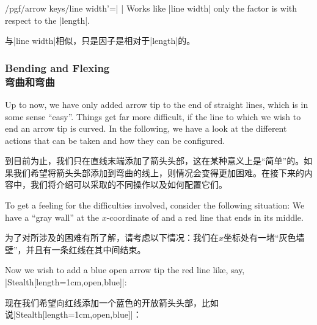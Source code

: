 \begin{key}{/pgf/arrow keys/line width'=| |}
    Works like |line width| only the factor is with respect to the |length|.

    与|line width|相似，只是因子是相对于|length|的。


\end{key}


\subsubsection{Bending and Flexing\\弯曲和弯曲}
\label{section-arrow-flex}

Up to now, we have only added arrow tip to the end of straight lines, which is
in some sense ``easy''. Things get far more difficult, if the line to which we
wish to end an arrow tip is curved. In the following, we have a look at the
different actions that can be taken and how they can be configured.

到目前为止，我们只在直线末端添加了箭头头部，这在某种意义上是“简单”的。如果我们希望将箭头头部添加到弯曲的线上，则情况会变得更加困难。在接下来的内容中，我们将介绍可以采取的不同操作以及如何配置它们。

To get a feeling for the difficulties involved, consider the following
situation: We have a ``gray wall'' at the $x$-coordinate of and a red line that
ends in its middle.

为了对所涉及的困难有所了解，请考虑以下情况：我们在$x$坐标处有一堵“灰色墙壁”，并且有一条红线在其中间结束。
%
\begin{codeexample}[preamble={\usetikzlibrary{patterns}}]
\def\wall{ \fill     [fill=black!50]  (1,-.5) rectangle (2,.5);
           \pattern  [pattern=bricks] (1,-.5) rectangle (2,.5);
           \draw     [line width=1pt]  (1cm+.5pt,-.5) -- ++(0,1); }
\end{codeexample}

Now we wish to add a blue open arrow tip the red line like, say,
|Stealth[length=1cm,open,blue]|:

现在我们希望向红线添加一个蓝色的开放箭头头部，比如说|Stealth[length=1cm,open,blue]|：
%
\begin{codeexample}
\usetikzlibrary{patterns}
\def\wall{ \fill     [fill=black!50]  (1,-.5) rectangle (2,.5);
           \pattern  [pattern=bricks] (1,-.5) rectangle (2,.5);
           \draw     [line width=1pt]  (1cm+.5pt,-.5) -- ++(0,1); }
\end{codeexample}
\begin{codeexample}[preamble={\usetikzlibrary{arrows.meta}}]
\end{codeexample}

